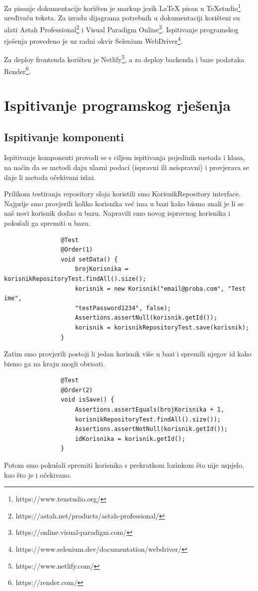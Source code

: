 			Za pisanje dokumentacije korišten je markup jezik LaTeX pisan u TeXstudio\footnote{https://www.texstudio.org/} uređivaču teksta. Za izradu dijagrama potrebnih u dokumentaciji korišteni su alati Astah Professional\footnote{https://astah.net/products/astah-professional/} i Visual Paradigm Online\footnote{https://online.visual-paradigm.com/}. Ispitivanje programskog rješenja provedeno je uz radni okvir Selenium WebDriver\footnote{https://www.selenium.dev/documentation/webdriver/}. 
			
			Za deploy frontenda korišten je Netlify\footnote{https://www.netlify.com/}, a za deploy backenda i baze podataka Render\footnote{https://render.com/}. 
			
			
			\eject 
		
	
		\section{Ispitivanje programskog rješenja}
			
			\subsection{Ispitivanje komponenti}
			
			Ispitivanje komponenti provodi se s ciljem ispitivanja pojedinih metoda i klasa, na način da se metodi daju ulazni podaci (ispravni ili neispravni) i provjerava se daje li metoda očekivani izlaz.
			
			\noindent Prilikom testiranja repository sloja koristili smo KorisnikRepository interface. Najprije smo provjerili koliko korisnika već ima u bazi kako bismo znali je li se naš novi korisnik dodao u bazu. Napravili smo novog ispravnog korisnika i pokušali ga spremiti u bazu.
			
			\begin{verbatim}
			    @Test
			    @Order(1)
			    void setData() {
			        brojKorisnika = korisnikRepositoryTest.findAll().size();
			        korisnik = new Korisnik("email@proba.com", "Test ime", 
			        "testPassword1234", false);
			        Assertions.assertNull(korisnik.getId());
			        korisnik = korisnikRepositoryTest.save(korisnik);
			    }
			\end{verbatim}
			Zatim smo provjerili postoji li jedan korisnik više u bazi i spremili njegov id kako bismo ga na kraju mogli obrisati.
			
			\begin{verbatim}
			    @Test
			    @Order(2)
			    void isSave() {
			        Assertions.assertEquals(brojKorisnika + 1,
			        korisnikRepositoryTest.findAll().size());
			        Assertions.assertNotNull(korisnik.getId());
			        idKorisnika = korisnik.getId();
			    } 
			\end{verbatim}
			Potom smo pokušali spremiti korisnika s prekratkom lozinkom što nije uspjelo, kao što je i očekivano.
			
